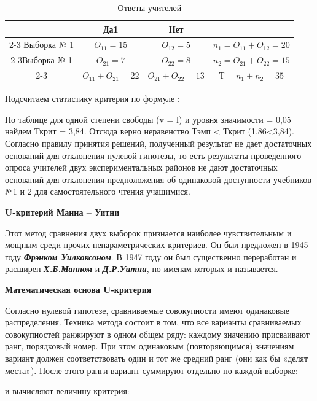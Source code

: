 \documentclass[12pt]{article}
\begin{document}
\begin{table}[h]
    \centering
    \caption{Ответы учителей}
    \bigskip
    \begin{tabular}{c|c|c|c} 
         &Да1&Нет&  \\
         \cline{2-3} Выборка № 1&\textit{$O_{11} = 15$}&\textit{$O_{12} = 5$}&\textit{$n_1 = O_{11} + O_{12} = 20$} \\
         \cline{2-3}Выборка № 1&\textit{$O_{21} = 7$}&\textit{$O_{22} = 8$}&\textit{$n_2 = O_{21} + O_{22} = 15$} \\
         \cline{2-3}&\textit{$O_{11} + O_{21} = 22$}&\textit{$O_{21} + O_{22} = 13$}&\textit{$Т = n_1 + n_2 = 35$}  \\
    \end{tabular}
\end{table}

Подсчитаем статистику критерия по формуле :
 
По таблице для одной степени свободы (v = l) и уровня значимости = 0,05 найдем  Ткрит = 3,84. Отсюда верно неравенство Тэмп < Ткрит (1,86<3,84). Согласно правилу принятия решений, полученный результат не дает достаточных оснований для отклонения нулевой гипотезы, то есть результаты проведенного опроса учителей двух экспериментальных районов не дают достаточных оснований для отклонения предположения об одинаковой доступности учебников №1 и 2 для самостоятельного чтения учащимися.

\medskip
\textbf{U-критерий Манна – Уитни}

\medskip
Этот метод сравнения двух выборок признается наиболее чувствительным и мощным среди прочих непараметрических критериев. Он был предложен в 1945 году \textbf{\textit{Фрэнком Уилкоксоном}}. В 1947 году он был существенно переработан и расширен \textbf{\textit{Х.Б.Манном}} и \textbf{\textit{Д.Р.Уитни}}, по именам которых и называется.

\medskip
\textbf{Математическая основа U-критерия}

\medskip
Согласно нулевой гипотезе, сравниваемые совокупности имеют одинаковые распределения. Техника метода состоит в том, что все варианты сравниваемых совокупностей ранжируют в одном общем ряду: каждому значению присваивают ранг, порядковый номер. При этом одинаковым (повторяющимся) значениям вариант должен соответствовать один и тот же средний ранг (они как бы «делят места»). После этого ранги вариант суммируют отдельно по каждой выборке:

и вычисляют величину критерия:
\end{document}
